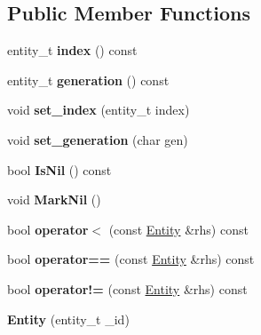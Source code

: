 \subsection*{Public Member Functions}
\begin{DoxyCompactItemize}
\item 
\mbox{\label{structnabla_1_1_entity_a4305d04861f997e061c98ff154d67063}} 
entity\+\_\+t {\bfseries index} () const
\item 
\mbox{\label{structnabla_1_1_entity_a5573713a19571f575b0245a8ed438172}} 
entity\+\_\+t {\bfseries generation} () const
\item 
\mbox{\label{structnabla_1_1_entity_a853114bf954cd6fed1cff037edfe74a2}} 
void {\bfseries set\+\_\+index} (entity\+\_\+t index)
\item 
\mbox{\label{structnabla_1_1_entity_ac93adb2a92a18f6f8a5d3ecf6844c317}} 
void {\bfseries set\+\_\+generation} (char gen)
\item 
\mbox{\label{structnabla_1_1_entity_a8a652f8962614abcd9d4ba657de2aad9}} 
bool {\bfseries Is\+Nil} () const
\item 
\mbox{\label{structnabla_1_1_entity_a337486b16f5243e1b54ea06bdb0f9087}} 
void {\bfseries Mark\+Nil} ()
\item 
\mbox{\label{structnabla_1_1_entity_a3cc2d169afbbe3d480b7432114ef26ba}} 
bool {\bfseries operator$<$} (const \mbox{\hyperlink{structnabla_1_1_entity}{Entity}} \&rhs) const
\item 
\mbox{\label{structnabla_1_1_entity_a7c9daf8724739c429a2c22c7fa271a31}} 
bool {\bfseries operator==} (const \mbox{\hyperlink{structnabla_1_1_entity}{Entity}} \&rhs) const
\item 
\mbox{\label{structnabla_1_1_entity_a4d68a63047a53435df7345276f397dda}} 
bool {\bfseries operator!=} (const \mbox{\hyperlink{structnabla_1_1_entity}{Entity}} \&rhs) const
\item 
\mbox{\label{structnabla_1_1_entity_a581385bd547fff8b133b8147f7fe40de}} 
{\bfseries Entity} (entity\+\_\+t \+\_\+id)
\end{DoxyCompactItemize}

